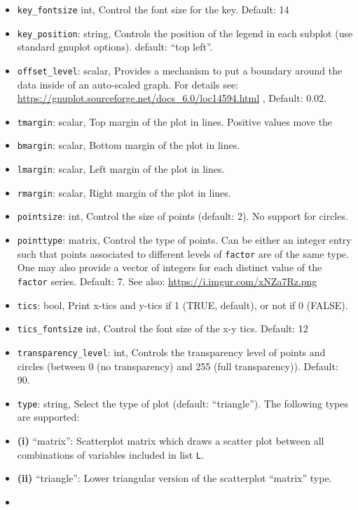 \documentclass{article}
\begin{document}
\begin{itemize}
  the \texttt{factor} variable. Default: 1 (TRUE).
\item
  \texttt{key\_fontsize} int, Control the font size for the key.
  Default: 14
\item
  \texttt{key\_position}: string, Controls the position of the legend in
  each subplot (use standard gnuplot options). default: ``top left''.
\item
  \texttt{offset\_level}: scalar, Provides a mechanism to put a boundary
  around the data inside of an auto-scaled graph. For details see:
  \url{https://gnuplot.sourceforge.net/docs\_6.0/loc14594.html} , Default:
  0.02.
\item
  \texttt{tmargin}: scalar, Top margin of the plot in lines. Positive
  values move the
\item
  \texttt{bmargin}: scalar, Bottom margin of the plot in lines.
\item
  \texttt{lmargin}: scalar, Left margin of the plot in lines.
\item
  \texttt{rmargin}: scalar, Right margin of the plot in lines.
\item
  \texttt{pointsize}: int, Control the size of points (default: 2). No
  support for circles.
\item
  \texttt{pointtype}: matrix, Control the type of points. Can be either
  an integer entry such that points associated to different levels of
  \texttt{factor} are of the same type. One may also provide a vector of
  integers for each distinct value of the \texttt{factor} series.
  Default: 7. See also: \url{https://i.imgur.com/xNZa7Rz.png}
\item
  \texttt{tics}: bool, Print x-tics and y-tics if 1 (TRUE, default), or
  not if 0 (FALSE).
\item
  \texttt{tics\_fontsize} int, Control the font size of the x-y tics.
  Default: 12
\item
  \texttt{transparency\_level}: int, Controls the transparency level of
  points and circles (between 0 (no transparency) and 255 (full
  transparency)). Default: 90.
\item
  \texttt{type}: string, Select the type of plot (default:
  ``triangle''). The following types are supported:
\item
  \textbf{(i)} ``matrix'': Scatterplot matrix which draws a scatter plot
  between all combinations of variables included in list \texttt{L}.
\item
  \textbf{(ii)} ``triangle'': Lower triangular version of the
  scatterplot ``matrix'' type.
\item

\end{itemize}
\end{document}

